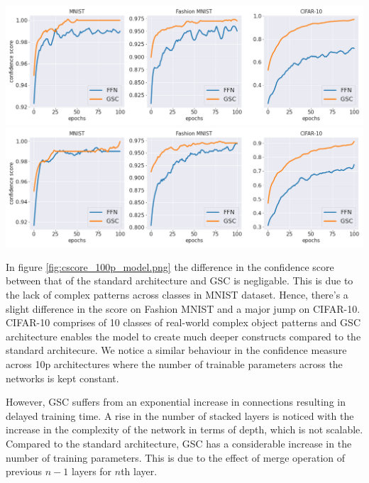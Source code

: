 \documentclass{article}
\begin{document}
\noindent\begin{minipage}{.5\textwidth}
   \centering
   \includegraphics[scale=0.2]{paper/cscore_100p_param.png}
   \label{fig:cscore_100p_model.png}
   \centering
   \includegraphics[scale=0.2]{paper/cscore_10p_param.png}
   \label{fig:cscore_10p_model.png}
\end{minipage}
\begin{minipage}{.4\textwidth}
In figure \ref{fig:cscore_100p_model.png} the difference in the confidence score between that of the standard architecture and GSC is negligable. This is due to the lack of complex patterns across classes in MNIST dataset. Hence, there's a slight difference in the score on Fashion MNIST and a major jump on CIFAR-10. CIFAR-10 comprises of 10 classes of real-world complex object patterns and GSC architecture enables the model to create much deeper constructs compared to the standard architecure. We notice a similar behaviour in the confidence measure across 10p architectures where the number of trainable parameters across the networks is kept constant.
\end{minipage}


However, GSC suffers from an exponential increase in connections resulting in delayed training time. A rise in the number of stacked layers is noticed with the increase in the complexity of the network in terms of depth, which is not scalable. Compared to the standard architecture, GSC has a considerable increase in the number of training parameters. This is due to the effect of merge operation of previous $n-1$ layers for $n$th layer.
\end{document}

